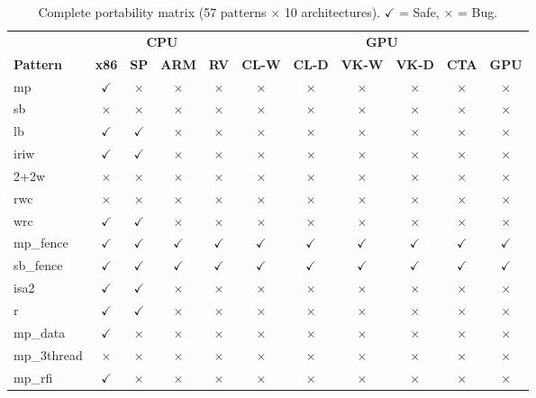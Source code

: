 \documentclass[10pt]{article}
\newcommand{\cmark}{$\checkmark$}
\newcommand{\xmark}{$\times$}
\begin{document}
{\tiny
\begin{table}[p]
\centering
\caption{Complete portability matrix (57 patterns $\times$ 10 architectures). \cmark{} = Safe, \xmark{} = Bug.}
\label{tab:full-matrix}
\begin{tabular}{l cccc cccccc}
\toprule
& \multicolumn{4}{c}{\textbf{CPU}} & \multicolumn{6}{c}{\textbf{GPU}} \\
\cmidrule(lr){2-5} \cmidrule(lr){6-11}
\textbf{Pattern} & \textbf{x86} & \textbf{SP} & \textbf{ARM} & \textbf{RV}
& \textbf{CL-W} & \textbf{CL-D} & \textbf{VK-W} & \textbf{VK-D} & \textbf{CTA} & \textbf{GPU} \\
\midrule
mp & \cmark & \xmark & \xmark & \xmark & \xmark & \xmark & \xmark & \xmark & \xmark & \xmark \\
sb & \xmark & \xmark & \xmark & \xmark & \xmark & \xmark & \xmark & \xmark & \xmark & \xmark \\
lb & \cmark & \cmark & \xmark & \xmark & \xmark & \xmark & \xmark & \xmark & \xmark & \xmark \\
iriw & \cmark & \cmark & \xmark & \xmark & \xmark & \xmark & \xmark & \xmark & \xmark & \xmark \\
2+2w & \xmark & \xmark & \xmark & \xmark & \xmark & \xmark & \xmark & \xmark & \xmark & \xmark \\
rwc & \xmark & \xmark & \xmark & \xmark & \xmark & \xmark & \xmark & \xmark & \xmark & \xmark \\
wrc & \cmark & \cmark & \xmark & \xmark & \xmark & \xmark & \xmark & \xmark & \xmark & \xmark \\
mp\_fence & \cmark & \cmark & \cmark & \cmark & \cmark & \cmark & \cmark & \cmark & \cmark & \cmark \\
sb\_fence & \cmark & \cmark & \cmark & \cmark & \cmark & \cmark & \cmark & \cmark & \cmark & \cmark \\
isa2 & \cmark & \cmark & \xmark & \xmark & \xmark & \xmark & \xmark & \xmark & \xmark & \xmark \\
r & \cmark & \cmark & \xmark & \xmark & \xmark & \xmark & \xmark & \xmark & \xmark & \xmark \\
mp\_data & \cmark & \xmark & \xmark & \xmark & \xmark & \xmark & \xmark & \xmark & \xmark & \xmark \\
mp\_3thread & \xmark & \xmark & \xmark & \xmark & \xmark & \xmark & \xmark & \xmark & \xmark & \xmark \\
mp\_rfi & \cmark & \xmark & \xmark & \xmark & \xmark & \xmark & \xmark & \xmark & \xmark & \xmark \\

\end{tabular}
\end{table}}
\end{document}
